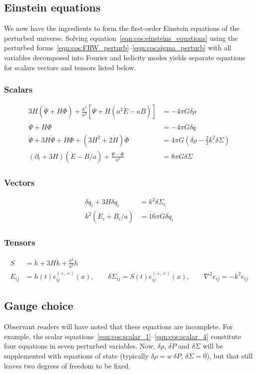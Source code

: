 \subsection{Einstein equations}
We now have the ingredients to form the first-order Einstein equations of the perturbed universe. Solving equation~\eqref{eqn:cos:einsteins_equations} using the perturbed forms~\eqref{eqn:cos:FRW_perturb}--\eqref{eqn:cos:sigma_perturb} with all variables decomposed into Fourier and helicity modes yields separate equations for scalars vectors and tensors listed below.
\subsubsection{Scalars}
\begin{align}
  3H\left( \dot{\Psi} + H \Phi  \right) + \frac{k^2}{a^2}\left[ \Psi + H\left( a^2\dot{E}-aB \right) \right] &= -4\pi G \delta\rho
  \label{eqn:cos:scalar_1} \\
  \dot{\Psi} + H \Phi &= -4\pi G \delta q 
  \label{eqn:cos:scalar_2}\\
  \dot{\Psi} + 3 H \dot{\Psi} + H \dot{\Phi} + \left( 3H^2 + 2\dot{H} \right)\Phi &= 4\pi G \left( \delta\rho - \frac{2}{3}k^2\delta\Sigma \right)
  \label{eqn:cos:scalar_3}\\
  \left( \partial_t + 3H \right)\left( \dot{E}-B/a \right) + \frac{\Psi-\Phi}{a^2} &= 8\pi G \delta\Sigma
  \label{eqn:cos:scalar_4}
\end{align}
\subsubsection{Vectors}
\begin{align}
  \delta \dot{q}_i + 3H \delta q_i &= k^2 \delta \Sigma_i \\
  k^2\left( \dot{E}_i + B_i/a  \right) &= 16\pi G \delta q_i
\end{align}


\subsubsection{Tensors}
\begin{align}
  S&=\ddot{h} + 3H \dot{h} + \frac{k^2}{a^2}h \\
  E_{ij} &= h(t) e_{ij}^{(+,\times)}(x), \qquad 
  \delta\Sigma_{ij} = S(t) e_{ij}^{(+,\times)}(x), \qquad 
  \nabla^2e_{ij} = -k^2 e_{ij}
\end{align}

\subsection{Gauge choice}
Observant readers will have noted that these equations are incomplete. For example, the scalar equations~\eqref{eqn:cos:scalar_1}--\eqref{eqn:cos:scalar_4} constitute four equations in seven perturbed variables. Now, $\delta\rho$, $\delta P$ and $\delta\Sigma$ will be supplemented with equations of state (typically $\delta\rho = w\:\delta P$, $\delta\Sigma=0$), but that still leaves two degrees of freedom to be fixed.

